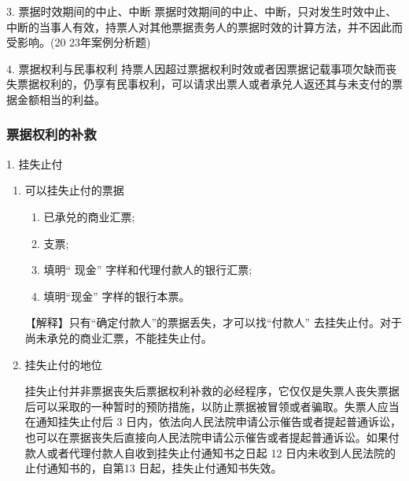 \documentclass[UTF8,12pt]{ctexart}
\numberwithin{equation}{section} %
\numberwithin{figure}{section}
\numberwithin{table}{section}
\begin{document}
	3. 票据时效期间的中止、中断
	票据时效期间的中止、中断，只对发生时效中止、中断的当事人有效，持票人对其他票据责务人的票据时效的计算方法，并不因此而受影响。(20 23年案例分析题)
	
	4. 票据权利与民事权利
	持票人因超过票据权利时效或者因票据记载事项欠缺而丧失票据权利的，仍享有民事权利，可以请求出票人或者承兑人返还其与未支付的票据金额相当的利益。
	
	
	\subsubsection{票据权利的补救}
	1. 挂失止付
	\begin{enumerate}
		\item 可以挂失止付的票据
		\begin{enumerate}
			\item 已承兑的商业汇票;
			
			\item 支票;
			
			\item 填明“ 现金” 字样和代理付款人的银行汇票;
			
			\item 填明“现金” 字样的银行本票。
		\end{enumerate}
		【解释】只有“确定付款人”的票据丢失，才可以找“付款人” 去挂失止付。对于尚未承兑的商业汇票，不能挂失止付。
		
		\item 挂失止付的地位
		
		挂失止付并非票据丧失后票据权利补救的必经程序，它仅仅是失票人丧失票据后可以采取的一种暂时的预防措施，以防止票据被冒领或者骗取。失票人应当在通知挂失止付后 3 日内，依法向人民法院申请公示催告或者提起普通诉讼，也可以在票据丧失后直接向人民法院申请公示催告或者提起普通诉讼。如果付款人或者代理付款人自收到挂失止付通知书之日起 12 日内未收到人民法院的止付通知书的，自第13 日起，挂失止付通知书失效。
	\end{enumerate}
\end{document}
